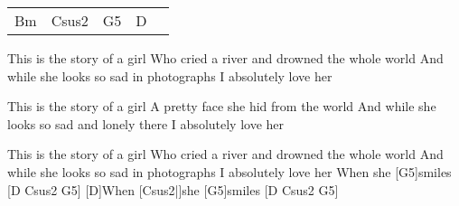 \begin{guitar}
	 {\footnotesize\begin{tabular}{|l|l|l|l|l}
			Bm & Csus2 & G5 & D & \optionalChord{(x4)}
	\end{tabular}}
	
	\begin{slimhighlightbar}
		 
	\end{slimhighlightbar}

	\begin{highlightbar}
		This is the story of a girl
		Who cried a river and drowned the whole world
		And while she looks so sad in photographs
		I absolutely love her
		
		This is the story of a girl
		A pretty face she hid from the world
		And while she looks so sad and lonely there
		I absolutely love her
		
		This is the story of a girl
		Who cried a river and drowned the whole world
		And while she looks so sad in photographs
		I absolutely love her
		When she [G5]smiles [D Csus2 G5]{}
		[D]When [Csus2|]{she} [G5]smiles [D Csus2 G5]{}
	\end{highlightbar}
\end{guitar}